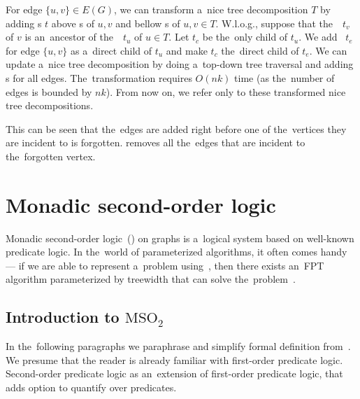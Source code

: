 For edge \( \{u, v\} \in E(G) \), we can transform a~nice tree decomposition \( T \)
by adding \IntroduceEdgeNode{}s \( t \) above \IntroduceVertexNode{}s of \( u, v \)
and bellow \ForgetVertexNode{}s of \( u, v \in T \).
%
W.l.o.g., suppose that the~\ForgetVertexNode{}~\( t_v \) of \( v \) is
an~ancestor of the~\ForgetVertexNode{}~\( t_u \) of \( u \in T \).
Let \( t_c \) be the~only child of \( t_u \).
%
We add \IntroduceEdgeNode{}~\( t_e \) for edge \( \{u, v\} \)
as a~direct child of \( t_u \) and make \( t_c \) the~direct child of \( t_e \).
%
We can update a~nice tree decomposition by doing
a~top-down tree traversal and adding \IntroduceEdgeNode{}s for all edges.
The~transformation requires \( O(nk) \) time (as the~number of edges is bounded by \( nk \)).
From now on, we refer only to these transformed nice tree decompositions.

%
%
This can be seen that the~edges are added right before one of the~vertices
they are incident to is forgotten. \ForgetVertexNode{} removes all the~edges
that are incident to the~forgotten vertex.

\section{Monadic second-order logic}

Monadic second-order logic~(\MSO{}) on graphs is a~logical system based on
well-known predicate logic.
In the~world of parameterized algorithms,
it often comes handy --- if we are able to represent a~problem using~\MSO{},
then there exists an~FPT algorithm parameterized by treewidth
that can solve the~problem~\cite{tree_width_mso}.

\subsection{Introduction to \( \text{MSO}_2 \)}

In the~following paragraphs we paraphrase and simplify formal definition
from~\cite{book_parametrized_algorithms}.
We presume that the reader is already familiar with first-order predicate logic.
Second-order predicate logic as an~extension of first-order predicate logic,
that adds option to quantify over predicates.

